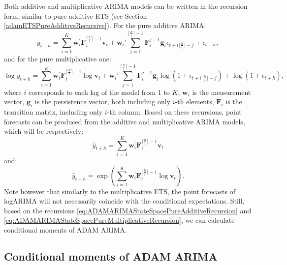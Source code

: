 \documentclass[]{book}
\theoremstyle{definition}
\theoremstyle{definition}
\theoremstyle{definition}
\theoremstyle{definition}
\theoremstyle{remark}
\begin{document}
Both additive and multiplicative ARIMA models can be written in the recursion form, similar to pure additive ETS (see Section \ref{adamETSPureAdditiveRecursive}). For the pure additive ARIMA:
\begin{equation}
    y_{t+h} = \sum_{i=1}^K \mathbf{w}_{i}^\prime \mathbf{F}_{i}^{\lceil\frac{h}{i}\rceil-1} \mathbf{v}_{t} + \mathbf{w}_{i}' \sum_{j=1}^{\lceil\frac{h}{i}\rceil-1} \mathbf{F}_{i}^{j-1} \mathbf{g}_{i} \epsilon_{t+i\lceil\frac{h}{i}\rceil-j} + \epsilon_{t+h} ,
  \label{eq:ADAMARIMAStateSpacePureAdditiveRecursion}
\end{equation}
and for the pure multiplicative one:
\begin{equation}
    \log y_{t+h} = \sum_{i=1}^K \mathbf{w}_{i}^\prime \mathbf{F}_{i}^{\lceil\frac{h}{i}\rceil-1} \log \mathbf{v}_{t} + \mathbf{w}_{i}' \sum_{j=1}^{\lceil\frac{h}{i}\rceil-1} \mathbf{F}_{i}^{j-1} \mathbf{g}_{i} \log (1+\epsilon_{t+i\lceil\frac{h}{i}\rceil-j}) + \log(1+ \epsilon_{t+h}) ,
  \label{eq:ADAMARIMAStateSpacePureMultiplicativeRecursion}
\end{equation}
where \(i\) corresponds to each lag of the model from 1 to \(K\), \(\mathbf{w}_{i}\) is the measurement vector, \(\mathbf{g}_{i}\) is the persistence vector, both including only \(i\)-th elements, \(\mathbf{F}_{i}\) is the transition matrix, including only \(i\)-th column. Based on these recursions, point forecasts can be produced from the additive and multiplicative ARIMA models, which will be respectively:
\begin{equation}
    \hat{y}_{t+h} = \sum_{i=1}^K \mathbf{w}_{i}^\prime \mathbf{F}_{i}^{\lceil\frac{h}{i}\rceil-1} \mathbf{v}_{t}
  \label{eq:ADAMARIMAStateSpacePureAdditiveForecast}
\end{equation}
and:
\begin{equation}
    \hat{y}_{t+h} = \exp\left(\sum_{i=1}^K \mathbf{w}_{i}^\prime \mathbf{F}_{i}^{\lceil\frac{h}{i}\rceil-1} \log \mathbf{v}_{t} \right) .
  \label{eq:ADAMARIMAStateSpacePureMultiplicativeForecast}
\end{equation}
Note however that similarly to the multiplicative ETS, the point forecasts of logARIMA will not necessarily coincide with the conditional expectations. Still, based on the recursions \eqref{eq:ADAMARIMAStateSpacePureAdditiveRecursion} and \eqref{eq:ADAMARIMAStateSpacePureMultiplicativeRecursion}, we can calculate conditional moments of ADAM ARIMA.

\hypertarget{ADAMARIMARecursiveMoments}{%
\subsection{Conditional moments of ADAM ARIMA}\label{ADAMARIMARecursiveMoments}}
\end{document}
